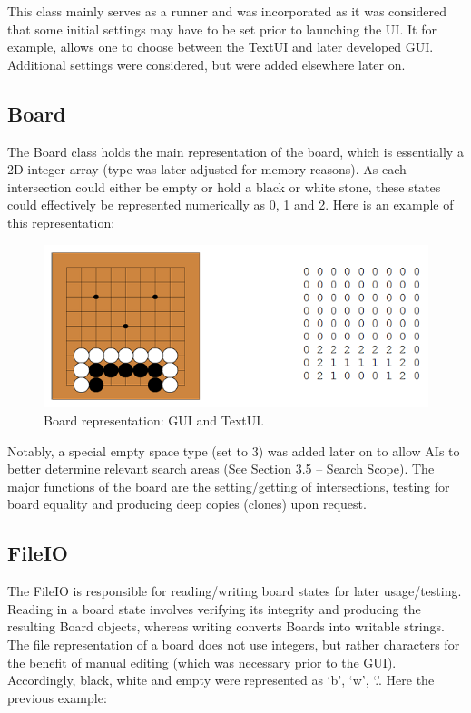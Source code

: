 \documentclass{l3proj}
\begin{document}
This class mainly serves as a runner and was incorporated as it was considered that some initial settings may have to be set prior to launching the UI. It for example, allows one to choose between the TextUI and later developed GUI. Additional settings were considered, but were added elsewhere later on.

\subsection{Board}

The Board class holds the main representation of the board, which is essentially a 2D integer array (type was later adjusted for memory reasons). As each intersection could either be empty or hold a black or white stone, these states could effectively be represented numerically as 0, 1 and 2. Here is an example of this representation:

\begin{figure}[H]
\centering
\includegraphics[scale=1]{Images/GE-BoardRep.png}
\caption{Board representation: GUI and TextUI.}
\end{figure}

Notably, a special empty space type (set to 3) was added later on to allow AIs to better determine relevant search areas (See Section 3.5 – Search Scope). The major functions of the board are the setting/getting of intersections, testing for board equality and producing deep copies (clones) upon request. 

\subsection{FileIO}

The FileIO is responsible for reading/writing board states for later usage/testing. Reading in a board state involves verifying its integrity and producing the resulting Board objects, whereas writing converts Boards into writable strings. The file representation of a board does not use integers, but rather characters for the benefit of manual editing (which was necessary prior to the GUI). Accordingly, black, white and empty were represented as ‘b’, ‘w’, ‘.’. Here the previous example:
\end{document}
